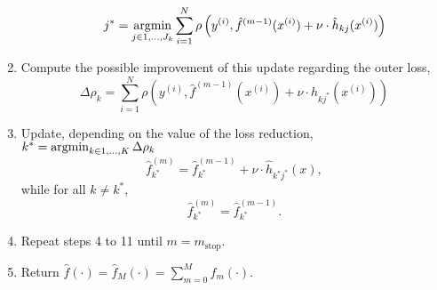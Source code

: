 \begin{algorithm}
\begin{enumerate}
\begin{itemize}
                \begin{equation}
                    j^*=\operatorname*{argmin}_{j\in 1,\ldots,J_k}\sum_{i=1}^N\rho\left(y^{(i)}, \hat{f}^{(m-1)}(x^{(i)}) + \nu \cdot \hat{h}_{kj}(x^{(i)}) \right)
                \end{equation}
        \end{itemize}
    \item Compute the possible improvement of this update regarding the outer loss,
        \begin{equation}
            \Delta\rho_k=\sum_{i=1}^N\rho\left(y^{(i)}, \hat{f}^{(m-1)}(x^{(i)}) + \nu \cdot \hat{h}_{kj^*}(x^{(i)}) \right)
        \end{equation}
    \item Update, depending on the value of the loss reduction, $k^*=\operatorname*{argmin}_{k\in1,\ldots,K}\Delta\rho_k$
        \begin{equation}
            \hat{f}^{(m)}_{k^*}=\hat{f}^{(m-1)}_{k^*}+\nu\cdot\hat{h}_{k^*j^*}(x),
        \end{equation}
        while for all $k\neq k^*$,
        \begin{equation}
            \hat{f}^{(m)}_{k^*}=\hat{f}^{(m-1)}_{k^*}.
        \end{equation}
    \item Repeat steps 4 to 11 until $m=m_{\text{stop}}$.
    \item Return $\hat{f}(\cdot)=\hat{f}_M(\cdot)=\sum_{m=0}^Mf_m(\cdot)$.
\end{enumerate}
\end{algorithm}